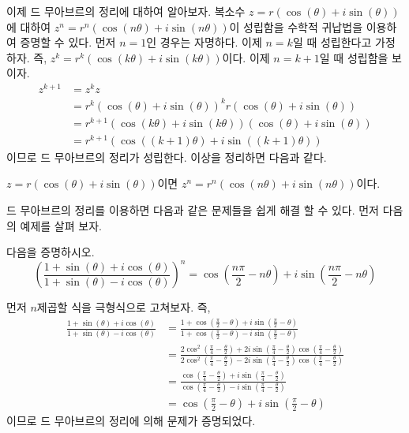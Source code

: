 \documentclass[11pt, a4paper]{book}
\begin{document}
이제 드 무아브르의 정리에 대하여 알아보자. 복소수 $z= r (\cos(\theta) + i \sin(\theta))$에 대하여 $z^{n} = r^{n} (\cos(n\theta) + i \sin(n\theta))$이 성립함을 수학적 귀납법을 이용하여 증명할 수 있다. 먼저 $n=1$인 경우는 자명하다. 이제 $n=k$일 때 성립한다고 가정하자. 즉, 
$z^{k} = r^{k}\left(\cos(k\theta) + i \sin(k\theta)\right)$이다. 이제
$n=k+1$일 때 성립함을 보이자.
\begin{align*}
	z^{k+1} &= z^{k} z \\
	&= r^{k}\left(\cos(\theta)+i \sin(\theta)\right)^{k} r\left(\cos(\theta) + i \sin(\theta)\right)\\
	&= r^{k+1} \left(\cos(k\theta) + i \sin(k \theta)\right)\left(\cos(\theta)+ i \sin(\theta)\right)\\
	&= r^{k+1} \left(\cos((k+1)\theta) + i \sin((k+1)\theta)\right)
\end{align*}
이므로 드 무아브르의 정리가 성립한다. 이상을 정리하면 다음과 같다.

\begin{theorem}[드 무아브르 정리]
	$z=r(\cos(\theta) + i \sin(\theta))$이면 $z^{n} =r^{n}(\cos(n\theta)+ i\sin(n\theta))$이다.
\end{theorem}
\vspace{1em}
 드 무아브르의 정리를 이용하면 다음과 같은 문제들을 쉽게 해결 할 수 있다. 먼저 다음의 예제를 살펴 보자.
 
 \begin{example}
 	다음을 증명하시오.
 	\begin{equation*}
 		\left(\frac{1+\sin(\theta)+i \cos(\theta)}{1+\sin(\theta)-i \cos(\theta)} \right)^{n} = \cos\left(\frac{n\pi}{2}-n\theta\right)+ i\sin\left(\frac{n\pi}{2}-n\theta\right)
 	\end{equation*}
 \begin{solution} 먼저 $n$제곱할 식을 극형식으로 고쳐보자. 즉,
 \begin{align*}
 	\frac{1+\sin(\theta)+i \cos(\theta)}{1+\sin(\theta)-i \cos(\theta)}  &= \frac{1+\cos\left(\frac{\pi}{2}-\theta\right)+i \sin\left(\frac{\pi}{2}-\theta\right)}{1+\cos\left(\frac{\pi}{2}-\theta\right)-i \sin\left(\frac{\pi}{2}-\theta\right)}\\
 	&= \frac{2\cos^{2}\left(\frac{\pi}{4}-\frac{\theta}{2}\right) + 2i \sin\left(\frac{\pi}{4}-\frac{\theta}{2}\right) \cos\left(\frac{\pi}{4}-\frac{\theta}{2}\right)}{2 \cos^{2}\left(\frac{\pi}{4}-\frac{\theta}{2}\right) - 2i \sin\left(\frac{\pi}{4}-\frac{\theta}{2}\right) \cos\left(\frac{\pi}{4}-\frac{\theta}{2}\right)}\\
 	&=\frac{\cos\left(\frac{\pi}{4}-\frac{\theta}{2}\right) + i \sin\left(\frac{\pi}{4}-\frac{\theta}{2}\right) }{\cos\left(\frac{\pi}{4}-\frac{\theta}{2}\right) - i \sin\left(\frac{\pi}{4}-\frac{\theta}{2}\right)}\\
 	&=\cos\left(\frac{\pi}{2}-\theta\right) + i \sin\left(\frac{\pi}{2}-\theta\right)
 \end{align*}
이므로 드 무아브르의 정리에 의해 문제가 증명되었다.
\end{solution}
 \end{example}
\vspace{2em}
\end{document}
